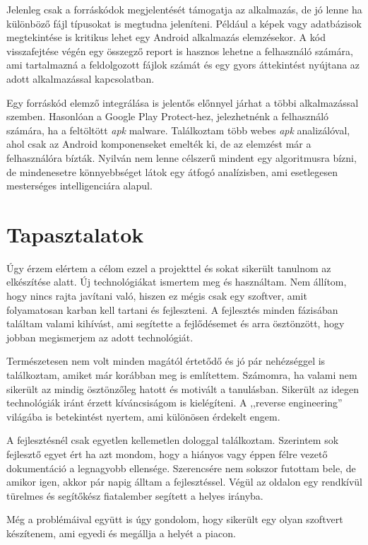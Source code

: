 \documentclass{thesis-ekf}
\theoremstyle{definition}
\theoremstyle{remark}
\begin{document}
Jelenleg csak a forráskódok megjelentését támogatja az alkalmazás, de jó lenne ha különböző fájl típusokat is megtudna jeleníteni.
Például a képek vagy adatbázisok megtekintése is kritikus lehet egy Android alkalmazás elemzésekor.
A kód visszafejtése végén egy összegző report is hasznos lehetne a felhasználó számára, ami tartalmazná a feldolgozott fájlok számát és egy gyors áttekintést nyújtana az adott alkalmazással kapcsolatban.

Egy forráskód elemző integrálása is jelentős előnnyel járhat a többi alkalmazással szemben. Hasonlóan a Google Play Protect-hez, jelezhetnénk a felhasználó számára, ha a feltöltött \emph{apk} malware.
Találkoztam több webes \emph{apk} analizálóval, ahol csak az Android komponenseket emelték ki, de az elemzést már a felhasználóra bízták.
Nyilván nem lenne célszerű mindent egy algoritmusra bízni, de mindenesetre könnyebbséget látok egy átfogó analízisben, ami esetlegesen mesterséges intelligenciára alapul.

\chapter{Tapasztalatok}\label{tapasztalatok}

Úgy érzem elértem a célom ezzel a projekttel és sokat sikerült tanulnom az elkészítése alatt.
Új technológiákat ismertem meg és használtam.
Nem állítom, hogy nincs rajta javítani való, hiszen ez mégis csak egy szoftver, amit folyamatosan karban kell tartani és fejleszteni.
A fejlesztés minden fázisában találtam valami kihívást, ami segítette a fejlődésemet és arra ösztönzött, hogy jobban megismerjem az adott technológiát.

Természetesen nem volt minden magától értetődő és jó pár nehézséggel is találkoztam, amiket már korábban meg is említettem.
Számomra, ha valami nem sikerült az mindig ösztönzőleg hatott és motivált a tanulásban.
Sikerült az idegen technológiák iránt érzett kíváncsiságom is kielégíteni.
A ,,reverse engineering'' világába is betekintést nyertem, ami különösen érdekelt engem. 

A fejlesztésnél csak egyetlen kellemetlen dologgal találkoztam. Szerintem sok fejlesztő egyet ért ha azt mondom, hogy a hiányos vagy éppen félre vezető dokumentáció a legnagyobb ellensége.
Szerencsére nem sokszor futottam bele, de amikor igen, akkor pár napig álltam a fejlesztéssel. Végül az oldalon egy rendkívül türelmes és segítőkész fiatalember segített a helyes irányba. 

Még a problémáival együtt is úgy gondolom, hogy sikerült egy olyan szoftvert készítenem, ami egyedi és megállja a helyét a piacon. 
\end{document}
